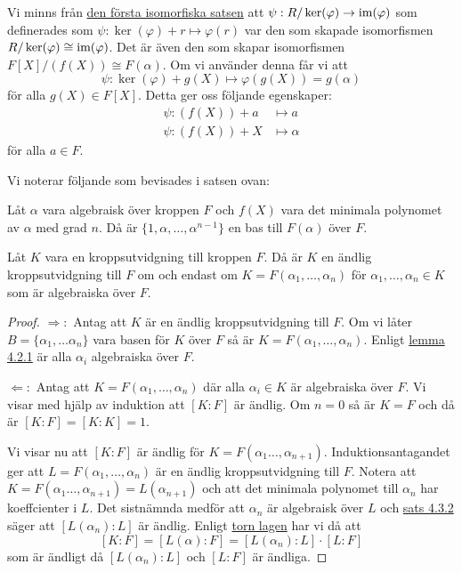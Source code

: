 \documentclass{article}
\newcommand{\im}[0]{\textnormal{im}}
\theoremstyle{definition}
\begin{document}
Vi minns från \hyperlink{isomorfiska}{den första isomorfiska satsen} att $\psi:R/\ker(\varphi) \rightarrow \im(\varphi)$ som definerades som 
$\psi: \ker(\varphi) + r \mapsto \varphi(r)$ var den som skapade isomorfismen $R/\ker(\varphi) \cong \im(\varphi)$. Det är även 
den som skapar isomorfismen $F[X]/(f(X)) \cong F(\alpha)$. Om vi använder denna får vi att
\[\psi: \ker(\varphi) + g(X) \mapsto \varphi(g(X)) = g(\alpha)\]
för alla $g(X) \in F[X]$. Detta ger oss följande egenskaper: 
\begin{align*}
  \psi: (f(X)) + a &\mapsto a \\
  \psi: (f(X)) + X &\mapsto \alpha
\end{align*}
för alla $a \in F.$

Vi noterar följande som bevisades i satsen ovan: 
\hypertarget{kol5.3.1}{}
\begin{mykol}{}{}
  Låt $\alpha$ vara algebraisk över kroppen $F$ och $f(X)$ vara det minimala polynomet av $\alpha$ med grad $n$. 
  Då är $\{1, \alpha, \ldots, \alpha^{n-1}\}$ en bas till $F(\alpha)$ över $F$. 
\end{mykol}

\hypertarget{sats5.3.3}{}
\begin{mytheo}{}{}
  Låt $K$ vara en kroppsutvidgning till kroppen $F$. Då är $K$ en ändlig kroppsutvidgning till $F$ om och endast om $K = F(\alpha_1, \ldots, \alpha_n)$
  för $\alpha_1, \ldots, \alpha_n \in K$ som är algebraiska över $F$.
\end{mytheo}

\begin{proof}
  $\Rightarrow:$ Antag att $K$ är en ändlig kroppsutvidgning till $F$. Om vi låter
  $B = \{\alpha_1, \ldots \alpha_n\}$ vara basen för $K$ över $F$ så är $K = F(\alpha_1, \ldots, \alpha_n)$. Enligt 
  \hyperlink{algebraiskkropp}{lemma 4.2.1} är alla $\alpha_i$ algebraiska över $F$.

  $\Leftarrow:$ Antag att $K = F(\alpha_1, \ldots, \alpha_n)$ där alla $\alpha_i \in K$ är algebraiska över $F$. Vi visar med hjälp av induktion att 
  $[K:F]$ är ändlig. Om $n = 0$ så är $K = F$ och då är $[K:F] = [K:K] = 1$.

  Vi visar nu att $[K:F]$ är ändlig för $K = F(\alpha_1 \ldots, \alpha_{n+1})$. Induktionsantagandet ger att $L = F(\alpha_1, \ldots, \alpha_n)$ 
  är en ändlig kroppsutvidgning till $F$. Notera att $K = F(\alpha_1 \ldots, \alpha_{n+1}) = L(\alpha_{n+1})$ och att det minimala polynomet till $\alpha_n$
  har koeffcienter i $L$. Det sistnämnda medför att $\alpha_n$ är algebraisk över $L$ och \hyperlink{5.3.2}{sats 4.3.2} säger att $[L(\alpha_n):L]$
  är ändlig. Enligt \hyperlink{torn lagen}{torn lagen} har vi då att 
  \[ [K:F] = [L(\alpha):F] = [L(\alpha_n): L] \cdot [L : F]\]
  som är ändligt då $[L(\alpha_n): L]$ och $[L : F]$ är ändliga. 
\end{proof}
\end{document}
